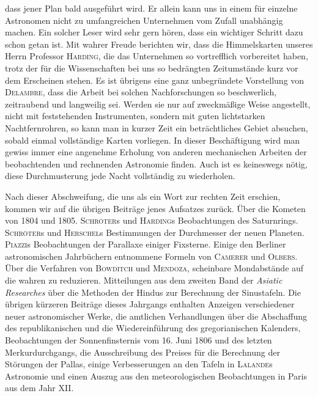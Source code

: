 dass jener Plan bald ausgeführt wird. Er allein kann uns in einem für einzelne Astronomen nicht zu umfangreichen Unternehmen vom Zufall unabhängig machen. Ein solcher Leser wird sehr gern hören, dass ein wichtiger Schritt dazu schon getan ist. Mit wahrer Freude berichten wir, dass die Himmelskarten unseres Herrn Professor \textsc{Harding}, die das Unternehmen so vortrefflich vorbereitet haben, trotz der für die Wissenschaften bei uns so bedrängten Zeitumstände kurz vor dem Erscheinen stehen. Es ist übrigens eine ganz unbegründete Vorstellung von \textsc{Delambre}, dass die Arbeit bei solchen Nachforschungen so beschwerlich, zeitraubend und langweilig sei. Werden sie nur auf zweckmäßige Weise angestellt, nicht mit feststehenden Instrumenten, sondern mit guten lichtstarken Nachtfernrohren, so kann man in kurzer Zeit ein beträchtliches Gebiet absuchen, sobald einmal vollständige Karten vorliegen. In dieser Beschäftigung wird man gewiss immer eine angenehme Erholung von anderen mechanischen Arbeiten der beobachtenden und rechnenden Astronomie finden. Auch ist es keineswegs nötig, diese Durchmusterung jede Nacht vollständig zu wiederholen.

Nach dieser Abschweifung, die uns als ein Wort zur rechten Zeit erschien, kommen wir auf die übrigen Beiträge jenes Aufsatzes zurück. Über die Kometen von 1804 und 1805. \textsc{Schröter}s und \textsc{Harding}s
 Beobachtungen des Saturnrings. \textsc{Schröter}s und \textsc{Herschel}s Bestimmungen der Durchmesser der neuen Planeten. \textsc{Piazzi}s Beobachtungen der Parallaxe einiger Fixsterne. Einige den Berliner astronomischen Jahrbüchern entnommene Formeln von \textsc{Camerer} und \textsc{Olbers}. Über die Verfahren von \textsc{Bowditch} und \textsc{Mendoza}, scheinbare Mondabstände auf die wahren zu reduzieren. Mitteilungen aus dem zweiten Band der \emph{Asiatic Researches} über die Methoden der Hindus zur Berechnung der Sinustafeln. Die übrigen kürzeren Beiträge dieses Jahrgangs enthalten Anzeigen verschiedener neuer astronomischer Werke, die amtlichen Verhandlungen über die Abschaffung des republikanischen und die Wiedereinführung des gregorianischen Kalenders, Beobachtungen der Sonnenfinsternis vom 16. Juni 1806 und des letzten Merkurdurchgangs, die Ausschreibung des Preises für die Berechnung der Störungen der Pallas, einige Verbesserungen an den Tafeln in \textsc{Lalande}s Astronomie und einen Auszug aus den meteorologischen Beobachtungen in Paris aus dem Jahr XII.

